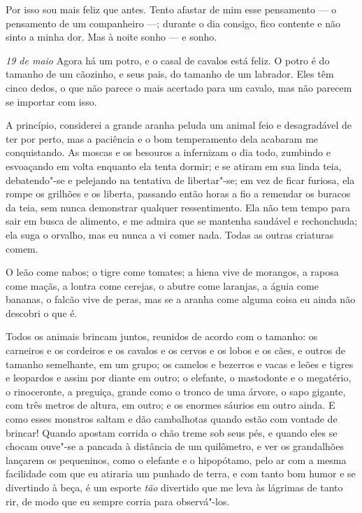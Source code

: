 Por isso sou mais feliz que antes. Tento afastar de mim esse pensamento --- o pensamento
de um companheiro ---; durante o dia consigo, fico contente e não sinto a minha dor. Mas
à noite sonho --- e sonho.

\sectionitem

\textit{19 de maio} Agora há um potro, e o casal de cavalos está feliz. O potro é do tamanho de um cãozinho,
e seus pais, do tamanho de um labrador. Eles têm cinco dedos, o que não parece o mais acertado
para um cavalo, mas não parecem se importar com isso.

A princípio, considerei a grande aranha peluda um animal feio e desagradável de ter por perto,
mas a paciência e o bom temperamento dela acabaram me conquistando. As moscas e os besouros
a infernizam o dia todo, zumbindo e esvoaçando em volta enquanto ela tenta dormir; e se atiram
em sua linda teia, debatendo"-se e pelejando na tentativa de libertar"-se; em vez de ficar furiosa, ela
rompe os grilhões e os liberta, passando então horas a fio a remendar os buracos da teia, sem
nunca demonstrar qualquer ressentimento. Ela não tem tempo para sair em busca de alimento, e me admira
que se mantenha saudável e rechonchuda; ela suga o orvalho, mas eu nunca a vi comer nada. Todas
as outras criaturas comem.

O leão come nabos; o tigre come tomates; a hiena vive de morangos, a raposa come maçãs, a lontra
come cerejas, o abutre come laranjas, a águia come bananas, o falcão vive de peras,
mas se a aranha come alguma coisa eu ainda não descobri o que é.

Todos os animais brincam juntos, reunidos de acordo com o tamanho: os carneiros e os cordeiros e os cavalos e os cervos
e os lobos e os cães, e outros de tamanho semelhante, em um grupo; os camelos e bezerros e vacas e leões e tigres e leopardos e assim por diante em outro;
o elefante, o mastodonte e o megatério, o rinoceronte, a preguiça, grande como o tronco de uma árvore, o sapo gigante, com três metros de altura,
em outro; e os enormes sáurios em outro ainda. E como esses monstros saltam e dão cambalhotas quando estão com vontade de brincar!
Quando apostam corrida o chão treme sob seus pés, e quando eles se chocam ouve"-se a pancada à distância de um quilômetro, e ver
os grandalhões lançarem os pequeninos, como o elefante e o hipopótamo, pelo ar com a mesma facilidade com que eu atiraria um punhado de terra,
e com tanto bom humor e se divertindo à beça, é um esporte \textit{tão} divertido que me leva às lágrimas de tanto rir, de modo que
eu sempre corria para observá"-los.


